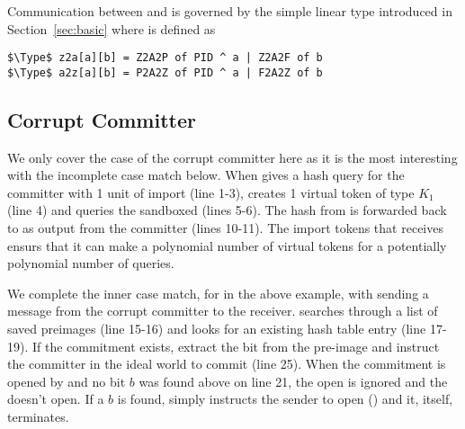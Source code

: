 Communication between \Z and \A is governed by the simple linear type \inline{comm[K][Z2A[2p][2f]} introduced in Section~\ref{sec:basic} where  is defined as 
\begin{lstlisting}[basicstyle=\footnotesize\BeraMonottFamily, mathescape]
$\Type$ z2a[a][b] = Z2A2P of PID ^ a | Z2A2F of b 
$\Type$ a2z[a][b] = P2A2Z of PID ^ a | F2A2Z of b
\end{lstlisting}

\subsection{Corrupt Committer}
We only cover the case of the corrupt committer here as it is the most interesting with the incomplete case match below.
When \Z gives \simcom a hash query for the committer with 1 unit of import (line 1-3), \simcom creates 1 virtual token of type $K_1$ (line 4) and queries the sandboxed \Fro (lines 5-6).  
The hash from \Fro is forwarded back to \Z as output  from the committer (lines 10-11).
The import tokens that \simcom receives ensurs that it can make a polynomial number of virtual tokens for a potentially polynomial number of queries. 

We complete the inner case match, for  in the above example, with \Z sending a message from the corrupt committer to the receiver.
\simcom searches through a list of saved preimages  (line 15-16) and looks for an existing hash table entry (line 17-19). 
If the commitment exists, extract the bit from the pre-image and instruct the committer in the ideal world to commit (line 25).
When the commitment is opened by \Z and no bit $b$ was found above on line 21, the open is ignored and the \Fcom doesn't open.
If a $b$ is found, \simcom simply instructs the sender to open () and it, itself, terminates.  

